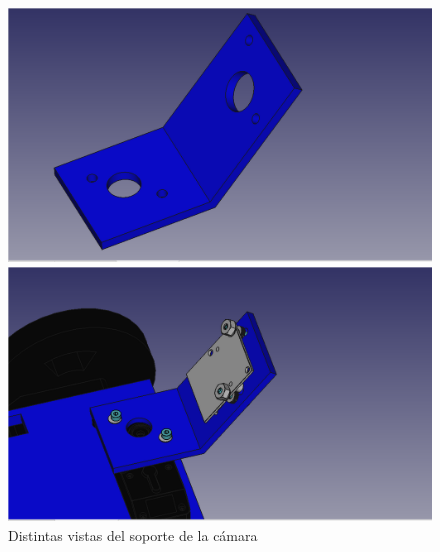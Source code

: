 \begin{figure}[ht!]
	\centering
	\begin{minipage}{0.45\linewidth}
		\centering
		\includegraphics[width=\linewidth]{figs/cap5/camera3sin.png}
		\caption*{\centering}
	\end{minipage}
	\hspace{1cm}
	\begin{minipage}{0.45\linewidth}
		\centering
		\includegraphics[width=\linewidth]{figs/cap5/camera2con.png}
		\caption*{\centering}
	\end{minipage}
	\caption{Distintas vistas del soporte de la cámara}
	\label{fig:pcamara}
\end{figure}

	
